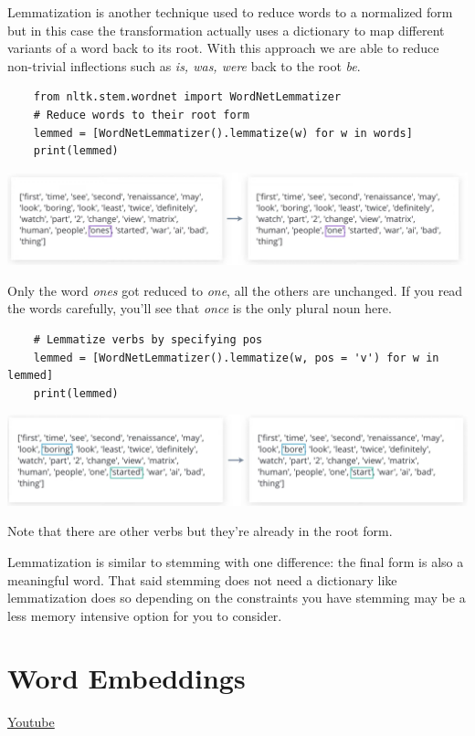 Lemmatization is another technique used to reduce words to a normalized form but in this case the transformation actually uses a dictionary to map different variants of a word back to its root. With this approach we are able to reduce non-trivial inflections such as \textit{is, was, were} back to the root \textit{be}. 

\begin{lstlisting}
    from nltk.stem.wordnet import WordNetLemmatizer
    # Reduce words to their root form
    lemmed = [WordNetLemmatizer().lemmatize(w) for w in words]
    print(lemmed)
\end{lstlisting}

\includegraphics[width=1\linewidth]{img//rnn//intro/lemmatizer.png}

Only the word \textit{ones} got reduced to \textit{one}, all the others are unchanged. If you read the words carefully, you'll see that \textit{once} is the only plural noun here. 

\begin{lstlisting}
    # Lemmatize verbs by specifying pos
    lemmed = [WordNetLemmatizer().lemmatize(w, pos = 'v') for w in lemmed]
    print(lemmed)
\end{lstlisting}

\includegraphics[width=1\linewidth]{img//rnn//intro/lemmitization2.png}

Note that there are other verbs but they're already in the root form. \newline

Lemmatization is similar to stemming with one difference: the final form is also a meaningful word. That said stemming does not need a dictionary like lemmatization does so
depending on the constraints you have stemming may be a less memory intensive option for you to consider.




\section{Word Embeddings}
\href{https://www.youtube.com/watch?v=QFQtwraClgk&t=1s&ab_channel=Udacity}{Youtube}

